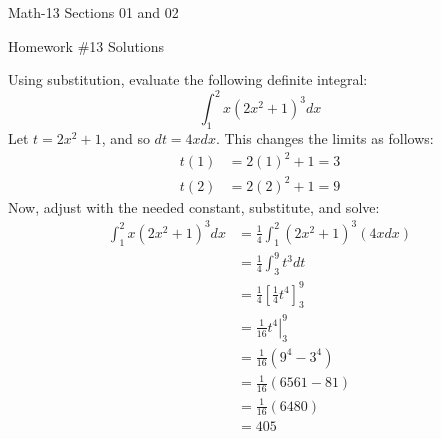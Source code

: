 \documentclass[letterpaper,12pt,fleqn]{article}
\begin{document}
\begin{center}
  \large
  Math-13 Sections 01 and 02

  \Large
  Homework \#13 Solutions
\end{center}

\vspace{0.5in}

Using substitution, evaluate the following definite integral:
\[\int_1^2x(2x^2+1)^3dx\]
Let \(t=2x^2+1\), and so \(dt=4xdx\).  This changes the limits as follows:
\begin{align*}
  t(1) &= 2(1)^2+1=3 \\
  t(2) &= 2(2)^2+1=9
\end{align*}
Now, adjust with the needed constant, substitute, and solve:
\begin{align*}
  \int_1^2x(2x^2+1)^3dx &= \frac{1}{4}\int_1^2(2x^2+1)^3(4xdx) \\
  &= \frac{1}{4}\int_3^9t^3dt \\
  &= \frac{1}{4}\left[\frac{1}{4}t^4\right]_3^9 \\
  &= \frac{1}{16}\left.t^4\right|_3^9 \\
  &= \frac{1}{16}(9^4-3^4) \\
  &= \frac{1}{16}(6561-81) \\
  &= \frac{1}{16}(6480) \\
  &= 405
\end{align*}
\end{document}
